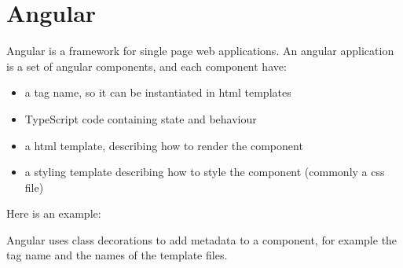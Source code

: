 
\chapter{Angular} \label{chapter:angular}

Angular is a framework for single page web applications. An angular application is a set of angular components, and each component have:
\begin{itemize}
\item a tag name, so it can be instantiated in html templates
\item TypeScript code containing state and behaviour
\item a html template, describing how to render the component
\item a styling template describing how to style the component (commonly a css file)
\end{itemize}
Here is an example:
Angular uses class decorations to add metadata to a component, for example the tag name and the names of the template files.

